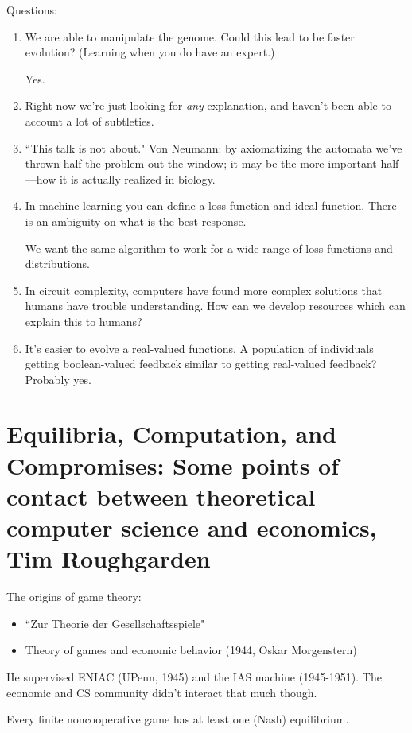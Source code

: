 Questions:
\begin{enumerate}
\item
We are able to manipulate the genome. Could this lead to be faster evolution? (Learning when you do have an expert.)

Yes.
\item
Right now we're just looking for {\it any} explanation, and haven't been able to account a lot of subtleties.
\item
``This talk is not about." Von Neumann: by axiomatizing the automata we've thrown half the problem out the window; it may be the more important half---how it is actually realized in biology.
\item In machine learning you can define a loss function and ideal function. 
There is an ambiguity on what is the best response.

We want the same algorithm to work for a wide range of loss functions and distributions.
\item
In circuit complexity, computers have found more complex solutions that humans have trouble understanding. How can we develop resources which can explain this to humans?
\item It's easier to evolve a real-valued functions. A population of individuals getting boolean-valued feedback similar to getting real-valued feedback? Probably yes.
\end{enumerate}

\section{Equilibria, Computation, and Compromises: Some points of contact between theoretical computer science and economics, Tim Roughgarden}


The origins of game theory:
\begin{itemize}
\item
``Zur Theorie der Gesellschaftsspiele"
\item
Theory of games and economic behavior (1944, Oskar Morgenstern)
\end{itemize}
He supervised ENIAC (UPenn, 1945) and the IAS machine (1945-1951). The economic and CS community didn't interact that much though.

\begin{thm}
Every finite noncooperative game has at least one (Nash) equilibrium.
\end{thm}

